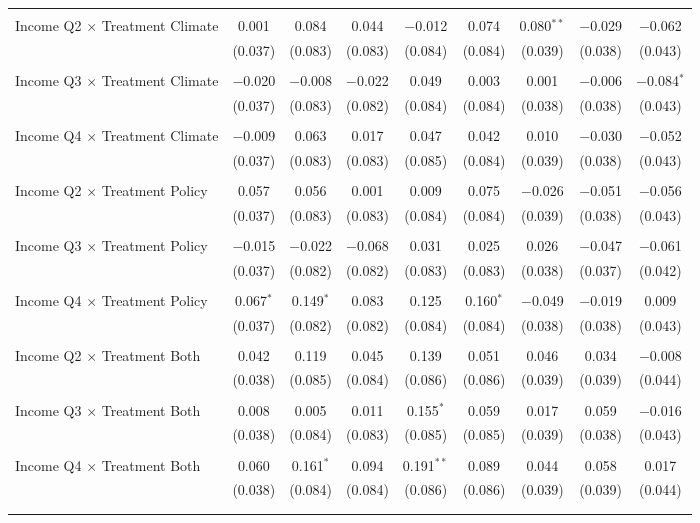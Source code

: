 \begin{tabular}{@{\extracolsep{5pt}}lcccccccc}
  & & & & & & & & \\ 
 Income Q2 $\times$ Treatment Climate & 0.001 & 0.084 & 0.044 & $-$0.012 & 0.074 & 0.080$^{**}$ & $-$0.029 & $-$0.062 \\ 
  & (0.037) & (0.083) & (0.083) & (0.084) & (0.084) & (0.039) & (0.038) & (0.043) \\ 
  & & & & & & & & \\ 
 Income Q3 $\times$ Treatment Climate & $-$0.020 & $-$0.008 & $-$0.022 & 0.049 & 0.003 & 0.001 & $-$0.006 & $-$0.084$^{*}$ \\ 
  & (0.037) & (0.083) & (0.082) & (0.084) & (0.084) & (0.038) & (0.038) & (0.043) \\ 
  & & & & & & & & \\ 
 Income Q4 $\times$ Treatment Climate & $-$0.009 & 0.063 & 0.017 & 0.047 & 0.042 & 0.010 & $-$0.030 & $-$0.052 \\ 
  & (0.037) & (0.083) & (0.083) & (0.085) & (0.084) & (0.039) & (0.038) & (0.043) \\ 
  & & & & & & & & \\ 
 Income Q2 $\times$ Treatment Policy & 0.057 & 0.056 & 0.001 & 0.009 & 0.075 & $-$0.026 & $-$0.051 & $-$0.056 \\ 
  & (0.037) & (0.083) & (0.083) & (0.084) & (0.084) & (0.039) & (0.038) & (0.043) \\ 
  & & & & & & & & \\ 
 Income Q3 $\times$ Treatment Policy & $-$0.015 & $-$0.022 & $-$0.068 & 0.031 & 0.025 & 0.026 & $-$0.047 & $-$0.061 \\ 
  & (0.037) & (0.082) & (0.082) & (0.083) & (0.083) & (0.038) & (0.037) & (0.042) \\ 
  & & & & & & & & \\ 
 Income Q4 $\times$ Treatment Policy & 0.067$^{*}$ & 0.149$^{*}$ & 0.083 & 0.125 & 0.160$^{*}$ & $-$0.049 & $-$0.019 & 0.009 \\ 
  & (0.037) & (0.082) & (0.082) & (0.084) & (0.084) & (0.038) & (0.038) & (0.043) \\ 
  & & & & & & & & \\ 
 Income Q2 $\times$ Treatment Both & 0.042 & 0.119 & 0.045 & 0.139 & 0.051 & 0.046 & 0.034 & $-$0.008 \\ 
  & (0.038) & (0.085) & (0.084) & (0.086) & (0.086) & (0.039) & (0.039) & (0.044) \\ 
  & & & & & & & & \\ 
 Income Q3 $\times$ Treatment Both & 0.008 & 0.005 & 0.011 & 0.155$^{*}$ & 0.059 & 0.017 & 0.059 & $-$0.016 \\ 
  & (0.038) & (0.084) & (0.083) & (0.085) & (0.085) & (0.039) & (0.038) & (0.043) \\ 
  & & & & & & & & \\ 
 Income Q4 $\times$ Treatment Both & 0.060 & 0.161$^{*}$ & 0.094 & 0.191$^{**}$ & 0.089 & 0.044 & 0.058 & 0.017 \\ 
  & (0.038) & (0.084) & (0.084) & (0.086) & (0.086) & (0.039) & (0.039) & (0.044) \\ 
  & & & & & & & & \\ 
\hline \\[-1.8ex] 


\end{tabular}
